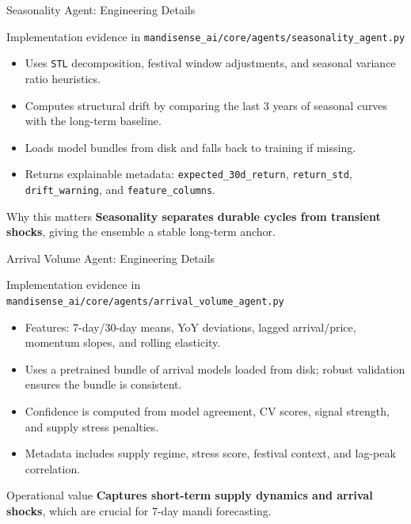 \documentclass{beamer}
\begin{document}
\begin{frame}{Seasonality Agent: Engineering Details}
\begin{infocard}{Implementation evidence in \texttt{mandisense\_ai/core/agents/seasonality\_agent.py}}
  \begin{itemize}
    \item Uses \texttt{STL} decomposition, festival window adjustments, and seasonal variance ratio heuristics.
    \item Computes structural drift by comparing the last 3 years of seasonal curves with the long-term baseline.
    \item Loads model bundles from disk and falls back to training if missing.
    \item Returns explainable metadata: \texttt{expected\_30d\_return}, \texttt{return\_std}, \texttt{drift\_warning}, and \texttt{feature\_columns}.
  \end{itemize}
\end{infocard}

\begin{successcard}{Why this matters}
  \textbf{Seasonality separates durable cycles from transient shocks}, giving the ensemble a stable long-term anchor.
\end{successcard}
\end{frame}

\begin{frame}{Arrival Volume Agent: Engineering Details}
\begin{infocard}{Implementation evidence in \texttt{mandisense\_ai/core/agents/arrival\_volume\_agent.py}}
  \begin{itemize}
    \item Features: 7-day/30-day means, YoY deviations, lagged arrival/price, momentum slopes, and rolling elasticity.
    \item Uses a pretrained bundle of arrival models loaded from disk; robust validation ensures the bundle is consistent.
    \item Confidence is computed from model agreement, CV scores, signal strength, and supply stress penalties.
    \item Metadata includes supply regime, stress score, festival context, and lag-peak correlation.
  \end{itemize}
\end{infocard}

\begin{alertcard}{Operational value}
  \textbf{Captures short-term supply dynamics and arrival shocks}, which are crucial for 7-day mandi forecasting.
\end{alertcard}
\end{frame}
\end{document}
